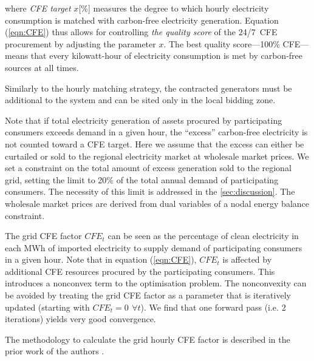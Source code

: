 \noindent where \textit{CFE target} $x$[\%] measures the degree to which hourly electricity consumption is matched with carbon-free electricity generation. 
Equation (\ref{eqn:CFE}) thus allows for controlling \textit{the quality score} of the 24/7~CFE procurement by adjusting the parameter $x$. The best quality score---100\% CFE---means that every kilowatt-hour of electricity consumption is met by carbon-free sources at all times.

Similarly to the hourly matching strategy, the contracted generators must be additional to the system and can be sited only in the local bidding zone.

Note that if total electricity generation of assets procured by participating consumers exceeds demand in a given hour, the \enquote{excess} carbon-free electricity is not counted toward a CFE target.
Here we assume that the excess can either be curtailed or sold to the regional electricity market at wholesale market prices.
We set a constraint on the total amount of excess generation sold to the regional grid, setting the limit to 20\% of the total annual demand of participating consumers.
The necessity of this limit is addressed in the \cref{sec:discussion}. The wholesale market prices are derived from dual variables of a nodal energy balance constraint. 

The grid CFE factor $CFE_t$ can be seen as the percentage of clean electricity in each MWh of imported electricity to supply demand of participating consumers in a given hour.
Note that in equation (\ref{eqn:CFE}), $CFE_t$ is affected by additional CFE resources procured by the participating consumers. 
This introduces a nonconvex term to the optimisation problem. 
The nonconvexity can be avoided by treating the grid CFE factor as a parameter that is iteratively updated (starting with $CFE_t =0 \,~\forall t$).
We find that one forward pass (i.e. 2 iterations) yields very good convergence.

The methodology to calculate the grid hourly CFE factor is described in the prior work of the authors \cite{riepin-zenodo-systemlevel247}.